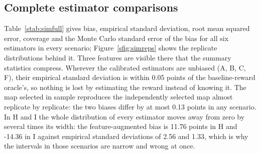 \documentclass[11pt,letterpaper]{article}
\begin{document}
\subsection{Complete estimator comparisons}
Table~\ref{stab:simfull} gives bias, empirical standard deviation, root mean squared error, coverage and the Monte Carlo standard error of the bias for all six estimators in every scenario; Figure~\ref{sfig:simreps} shows the replicate distributions behind it. Three features are visible there that the summary statistics compress. Wherever the calibrated estimators are unbiased (A, B, C, F), their empirical standard deviation is within 0.05 points of the baseline-reward oracle's, so nothing is lost by estimating the reward instead of knowing it. The map selected in sample reproduces the independently selected map almost replicate by replicate: the two biases differ by at most 0.13 points in any scenario. In H and I the whole distribution of every estimator moves away from zero by several times its width: the feature-augmented bias is 11.76 points in H and -14.36 in I against empirical standard deviations of 2.56 and 1.33, which is why the intervals in those scenarios are narrow and wrong at once.
\end{document}

